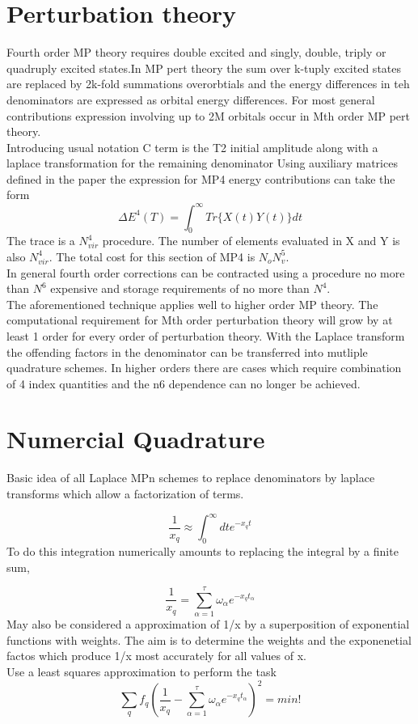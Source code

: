 \documentclass[10pt, draft]{article}
\begin{document}
\section{Perturbation theory}
Fourth order MP theory requires double excited and singly, double, triply or quadruply excited states.In MP pert theory the sum over k-tuply excited states are replaced by 2k-fold summations overorbtials and the energy differences in teh denominators are expressed as orbital energy differences.  For most general contributions expression involving up to 2M orbitals occur in Mth order MP pert theory.  \\
Introducing usual notation C term is the T2 initial amplitude along with a laplace transformation for the remaining denominator Using auxiliary matrices defined in the paper the expression for MP4 energy contributions can take the form 
\[ \Delta E^4(T) = \int_0^\infty Tr\{X(t) Y(t)\}dt\]
The trace is a $N_{vir}^4$ procedure.  The number of elements evaluated in X and Y is also $N_{vir}^4$.  The total cost for this section of MP4 is $N_oN^5_v$.\\

In general fourth order corrections can be contracted using a procedure no more than $N^6$ expensive and storage requirements of no more than $N^4$.  \\
The aforementioned technique applies well to higher order MP theory.  The computational requirement for Mth order perturbation theory will grow by at least 1 order for every order of perturbation theory.  With the Laplace transform the offending factors in the denominator can be transferred into mutliple quadrature schemes.  In higher orders there are cases which require combination of 4 index quantities and the n6 dependence can no longer be achieved.  

\section{Numercial Quadrature}

Basic idea of all Laplace MPn schemes to replace denominators by laplace transforms which allow a factorization of terms.  

\[ \frac{1}{x_q} \approx \int_0^\infty dt e^{-x_qt}\]
To do this integration numerically amounts to replacing the integral by a finite sum,

\[\frac{1}{x_q} = \sum_{\alpha = 1}^\tau \omega_\alpha e^{-x_qt_{\alpha}}\]
May also be considered a approximation of 1/x by a superposition of exponential functions with weights.  The aim is to determine the weights and the exponenetial factos which produce 1/x most accurately for all values of x.\\
Use a least squares approximation to perform the task
\[ \sum_q f_q (\frac{1}{x_q} - \sum_{\alpha=1}^\tau \omega_\alpha e^{-x_q t_\alpha})^2 = min!\]
\end{document}
